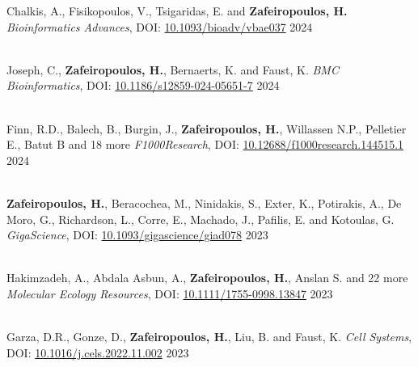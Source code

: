 \documentclass[
    a4paper,
]{fortysecondscv}
\begin{document}
\begin{cvtable}

    {Chalkis, A., Fisikopoulos, V., Tsigaridas, E. and \textbf{Zafeiropoulos, H.}}
    {\textit{Bioinformatics Advances}, 
    DOI: \href{https://doi.org/10.1093/bioadv/vbae037}{10.1093/bioadv/vbae037}}
    {2024} 

    \\

    {Joseph, C., \textbf{Zafeiropoulos, H.}, Bernaerts, K. and Faust, K.}
    {\textit{BMC Bioinformatics}, 
    DOI: \href{https://doi.org/10.1186/s12859-024-05651-7}{10.1186/s12859-024-05651-7}}
    {2024}

    \\

    {Finn, R.D., Balech, B., Burgin, J., \textbf{Zafeiropoulos, H.}, Willassen N.P., Pelletier E., Batut B and 18 more}
    {\textit{F1000Research}, 
    DOI: \href{https://doi.org/10.12688/f1000research.144515.1}{10.12688/f1000research.144515.1}}
    {2024}

    \\

    {\textbf{Zafeiropoulos, H.}, Beracochea, M., Ninidakis, S., Exter, K., Potirakis, A., De Moro, G., Richardson, L., Corre, E., Machado, J., Pafilis, E. and Kotoulas, G.}
    {\textit{GigaScience}, DOI: \href{https://doi.org/10.1093/gigascience/giad078}{10.1093/gigascience/giad078}} {2023}  

    \\

    {Hakimzadeh, A., Abdala Asbun, A., \textbf{Zafeiropoulos, H.}, Anslan S. and 22 more}
    {\textit{Molecular Ecology Resources}, 
    DOI: \href{https://doi.org/10.1111/1755-0998.13847}{10.1111/1755-0998.13847}}
    {2023}

    \\

    {Garza, D.R., Gonze, D., \textbf{Zafeiropoulos, H.}, Liu, B. and Faust, K.}
    {\textit{Cell Systems}, 
    DOI: \href{https://doi.org/10.1016/j.cels.2022.11.002}{10.1016/j.cels.2022.11.002}}
    {2023} 


\end{cvtable}
\end{document}
